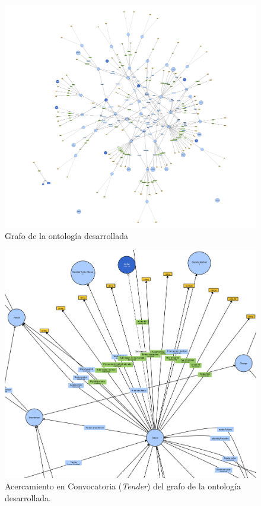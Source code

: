 \begin{figure}[ht!]
    \includegraphics[width=180mm]{figuras/grafoOCDS.png}
    \caption{Grafo de la ontología desarrollada}
    \label{img:grafo ontologia desarrolla}
    \end{figure}

    \begin{figure}[ht!]
        \includegraphics[width=150mm]{figuras/zoomTender.png}
        \caption{Acercamiento en Convocatoria (\textit{Tender}) del grafo de la ontología desarrollada.}
        \label{img:zoomTender}
        \end{figure}


